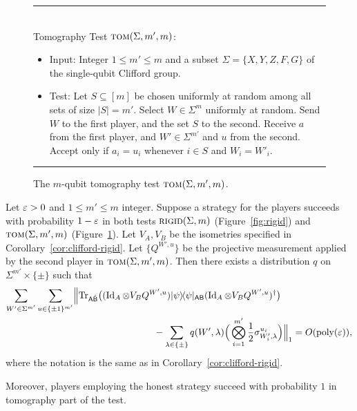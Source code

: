 \begin{figure}[H]
\rule[1ex]{\textwidth}{0.5pt}\\
Tomography Test $\textsc{tom}(\Sigma,m',m)$: 
\begin{itemize}
    \item Input: Integer $1\leq m'\leq m$ and a subset $\Sigma = \{X,Y,Z,F,G\}$ of the single-qubit Clifford group. 
    \item Test: Let $S\subseteq [m]$ be chosen uniformly at random among all sets of size $|S|=m'$. Select $W\in\Sigma^{m}$ uniformly at random. Send $W$ to the first player, and the set $S$ to the second. Receive $a$ from the first player, and $W'\in\Sigma^{m'}$ and $u$ from the second. Accept only if $a_i=u_i$ whenever $i\in S$ and $W_i=W'_i$. 
\end{itemize}
\rule[2ex]{\textwidth}{0.5pt}\vspace{-.5cm}
\caption{The $m$-qubit tomography test $\textsc{tom}(\Sigma,m',m)$.}
\label{fig:tomography-test}
\end{figure} 

\begin{corollary}\label{cor:clifford-rigid-adaptive}
Let $\varepsilon>0$ and $1\leq m'\leq m$ integer. Suppose a strategy for the players
  succeeds with probability $1-\varepsilon$ in both tests $\textsc{rigid}(\Sigma,m)$
  (Figure~\ref{fig:rigid}) and $\textsc{tom}(\Sigma,m',m)$
  (Figure~\ref{fig:tomography-test}). Let $V_A,V_B$ be the isometries specified
  in Corollary~\ref{cor:clifford-rigid}. Let $\{Q^{W',u}\}$ be the projective
  measurement applied by the second player in $\textsc{tom}(\Sigma,m',m)$. Then there exists a distribution $q$ on $\Sigma^{m'} \times \{\pm \}$ such that 
\begin{align*}
 \sum_{W'\in\Sigma^{m'}} \sum_{u\in\{\pm1\}^{m'}} &\Big\| \Tr_{\reg{A}\hat{\reg{B}}} \big((\Id_A \otimes V_B Q^{W',u} )\proj{\psi}_{\reg{AB}} (\Id_A \otimes V_B Q^{W',u})^\dagger\big)\\
&\hskip3cm - \sum_{\lambda\in\{\pm\}}  q(W',\lambda)  \Big( \bigotimes_{i=1}^{m'} \frac{1}{2}\sigma_{W'_i,\lambda}^{u_i}\Big) \Big\|_1 = O(\poly(\eps)),
\end{align*}
where the notation is the same as in Corollary~\ref{cor:clifford-rigid}. 

Moreover, players employing the honest strategy succeed with probability $1$ in
  tomography part of the test. 
\end{corollary}

